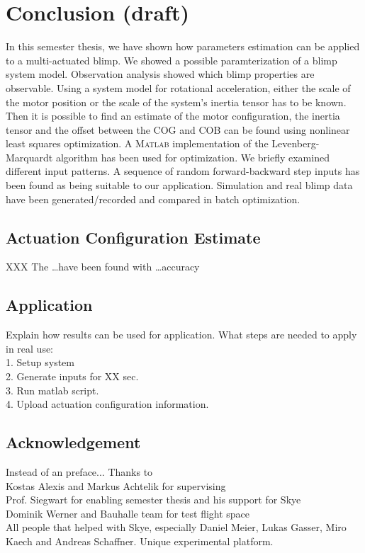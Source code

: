 \chapter{Conclusion (draft)}
\label{chap:conclusion}

In this semester thesis, we have shown how parameters estimation can be applied to a multi-actuated blimp.
We showed a possible paramterization of a blimp system model.
Observation analysis showed which blimp properties are observable.
Using a system model for rotational acceleration, either the scale of the motor position or the scale of the system's inertia tensor has to be known.
Then it is possible to find an estimate of the motor configuration, the inertia tensor and the offset between the COG and COB can be found using nonlinear least squares optimization.
A \textsc{Matlab} implementation of the Levenberg-Marquardt algorithm has been used for optimization.
We briefly examined different input patterns.
A sequence of random forward-backward step inputs has been found as being suitable to our application.
Simulation and real blimp data have been generated/recorded and compared in batch optimization.

\section{Actuation Configuration Estimate}
XXX
The \dots have been found with \dots accuracy


\section{Application}
Explain how results can be used for application.
What steps are needed to apply in real use: \\
1. Setup system \\
2. Generate inputs for XX sec. \\
3. Run matlab script. \\
4. Upload actuation configuration information.

\section{Acknowledgement}

Instead of an preface...
Thanks to \\
Kostas Alexis and Markus Achtelik for supervising \\
Prof. Siegwart for enabling semester thesis and his support for Skye \\
Dominik Werner and Bauhalle team for test flight space \\
All people that helped with Skye, especially Daniel Meier, Lukas Gasser, Miro Kaech and Andreas Schaffner. Unique experimental platform.